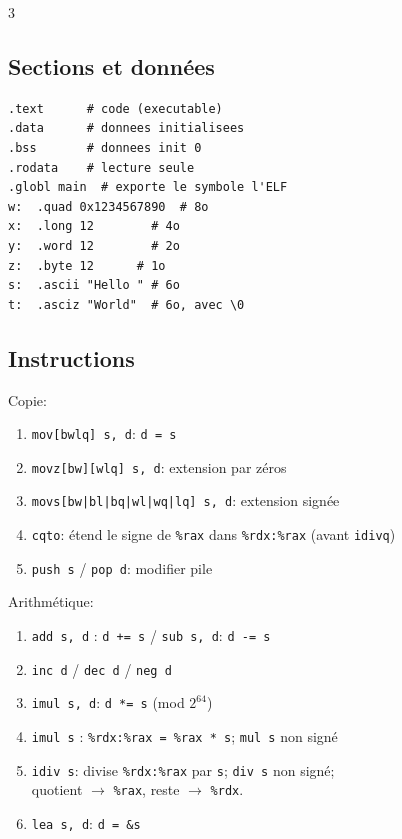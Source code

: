\documentclass[12pt, a4paper]{article}
\begin{document}
\begin{multicols*}{3}
	\colbreak
	\subsection{Sections et données}
	\begin{lstlisting}
.text      # code (executable)
.data      # donnees initialisees
.bss       # donnees init 0
.rodata    # lecture seule
.globl main  # exporte le symbole l'ELF
w:  .quad 0x1234567890  # 8o
x:  .long 12        # 4o 
y:  .word 12        # 2o
z:  .byte 12      # 1o
s:  .ascii "Hello " # 6o
t:  .asciz "World"  # 6o, avec \0
\end{lstlisting}

	\subsection{Instructions}
	Copie:
	\begin{enumerate}[\roman*.]
		\item \lstinline|mov[bwlq] s, d|: \lstinline|d = s|
		\item \lstinline|movz[bw][wlq] s, d|: extension par zéros
		\item \lstinline!movs[bw|bl|bq|wl|wq|lq] s, d!: extension signée
		\item \lstinline|cqto|: étend le signe de \lstinline|%rax| dans \lstinline|%rdx:%rax| (avant \lstinline|idivq|)
		\item \lstinline|push s| / \lstinline|pop d|: modifier pile
	\end{enumerate}

	Arithmétique:
	\begin{enumerate}[\roman*.]
		\item \lstinline|add s, d| : \lstinline|d += s| / \lstinline|sub s, d|: \lstinline|d -= s|
		\item \lstinline|inc d| / \lstinline|dec d| / \lstinline|neg d|
		\item \lstinline|imul s, d|: \lstinline|d *= s| (mod $2^{64}$)
		\item \lstinline|imul s| : \lstinline|%rdx:%rax = %rax * s|; \lstinline|mul s| non signé
		\item \lstinline|idiv s|: divise \lstinline|%rdx:%rax| par \lstinline|s|; \lstinline|div s| non signé; \\quotient $\rightarrow$ \lstinline|%rax|, reste $\rightarrow$ \lstinline|%rdx|.
		\item \lstinline|lea s, d|: \lstinline|d = &s|
	\end{enumerate}


\end{multicols*}
\end{document}
